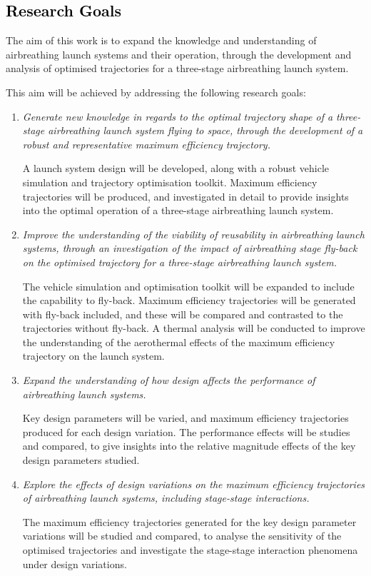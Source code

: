   	   

  	  	
  	  	
\textcolor{black}{
  \section{Research Goals}
}
\noindent
    The aim of this work is to expand the knowledge and understanding of airbreathing launch systems and their operation, through the development and analysis of optimised trajectories for a three-stage airbreathing launch system. 
    
\vspace*{10pt}
    \noindent This aim will be achieved by addressing the following research goals:
    \begin{enumerate}
    	 \item \emph{Generate new knowledge in regards to the optimal trajectory shape of a three-stage airbreathing launch system flying to space, through the development of a robust and representative maximum efficiency trajectory.}
    	 
    	 A launch system design will be developed, along with a robust vehicle simulation and trajectory optimisation toolkit. Maximum efficiency trajectories will be produced, and investigated in detail to provide insights into the optimal operation of a three-stage airbreathing launch system.  
    	    \\
\item \emph{Improve the understanding of the viability of reusability in airbreathing launch systems, through an investigation of the impact of airbreathing stage fly-back on the optimised trajectory for a three-stage airbreathing launch system. }

The vehicle simulation and optimisation toolkit will be expanded to include the capability to fly-back. Maximum efficiency trajectories will be generated with fly-back included, and these will be compared and contrasted to the trajectories without fly-back. A thermal analysis will be conducted to improve the understanding of the aerothermal effects of the maximum efficiency trajectory on the launch system. 
 \\
      \item \emph{Expand the understanding of how design affects the performance of airbreathing launch systems. }
      
      Key design parameters will be varied, and maximum efficiency trajectories produced for each design variation. The performance effects will be studies and compared, to give insights into the relative magnitude effects of the key design parameters studied. 
\\
\item \emph{Explore the effects of design variations on the maximum efficiency trajectories of airbreathing launch systems, including stage-stage interactions. }

The maximum efficiency trajectories generated for the key design parameter variations will be studied and compared, to analyse the sensitivity of the optimised trajectories and investigate the stage-stage interaction phenomena under design variations. 
\\
    \end{enumerate}

